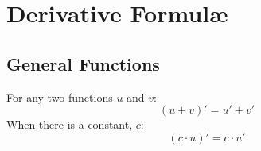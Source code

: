 \documentclass[../main.tex]{subfiles}
\begin{document}
\chapter{Derivative Formulæ}
\section{General Functions}
For any two functions $u$ and $v$:
\[ (u + v)' = u' + v' \]
When there is a constant, $c$:
\[ (c \cdot u)' = c \cdot u' \]
\end{document}
